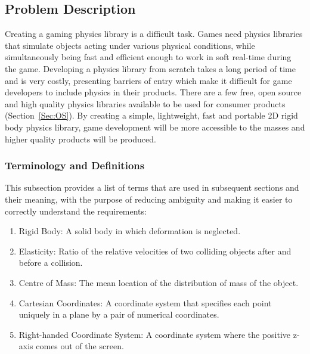 \documentclass[12pt]{article}
\begin{document}
\subsection{Problem Description}
\label{Sec:PD}
Creating a gaming physics library is a difficult task. Games need physics libraries that simulate objects acting under various physical conditions, while simultaneously being fast and efficient enough to work in soft real-time during the game. Developing a physics library from scratch takes a long period of time and is very costly, presenting barriers of entry which make it difficult for game developers to include physics in their products. There are a few free, open source and high quality physics libraries available to be used for consumer products (Section~\ref{Sec:OS}). By creating a simple, lightweight, fast and portable 2D rigid body physics library, game development will be more accessible to the masses and higher quality products will be produced.
\subsubsection{Terminology and Definitions}
\label{Sec:TaD}
This subsection provides a list of terms that are used in subsequent sections and their meaning, with the purpose of reducing ambiguity and making it easier to correctly understand the requirements:
\begin{enumerate}
\item{Rigid Body: A solid body in which deformation is neglected.}
\item{Elasticity: Ratio of the relative velocities of two colliding objects after and before a collision.}
\item{Centre of Mass: The mean location of the distribution of mass of the object.}
\item{Cartesian Coordinates: A coordinate system that specifies each point uniquely in a plane by a pair of numerical coordinates.}
\item{Right-handed Coordinate System: A coordinate system where the positive z-axis comes out of the screen.}
\end{enumerate}
\end{document}
